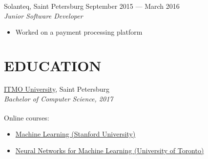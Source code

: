 \documentclass[margin]{cv}
\begin{document}
\begin{resume}
Solanteq, Saint Petersburg \hfill September 2015 --- March 2016 \\
{\sl Junior Software Developer}
\begin{itemize}
    \itemsep-2pt
    \itemindent-10pt
	\item Worked on a payment processing platform
\end{itemize}

\section{EDUCATION}
\href{https://en.itmo.ru}{ITMO University}, Saint Petersburg \\
{\sl Bachelor of Computer Science, 2017} \\\\
Online courses:
\begin{itemize}
    \itemsep-2pt
    \itemindent-10pt
    \item \href{https://www.coursera.org/account/accomplishments/verify/NAC3H6WDW9TL}{Machine Learning (Stanford University)}
    \item \href{https://www.coursera.org/account/accomplishments/verify/2LMELT5R6D25}{Neural Networks for Machine Learning (University of Toronto)}
\end{itemize}

\end{resume}
\end{document}
